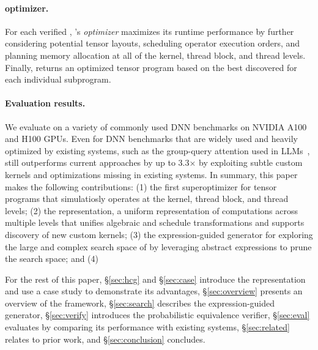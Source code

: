 \paragraph{\graph optimizer.} For each verified \graph, \sys's {\em \graph optimizer} maximizes its runtime performance by further considering potential tensor layouts, scheduling operator execution orders, and planning memory allocation at all of the kernel, thread block, and thread levels.
%
Finally, \sys returns an optimized tensor program based on the best discovered \graph for each individual \lax subprogram.


\paragraph{Evaluation results.}
We evaluate \sys on a variety of commonly used DNN benchmarks on NVIDIA A100 and H100 GPUs.
Even for DNN benchmarks that are widely used and heavily optimized by existing systems, such as the group-query attention used in LLMs~\cite{grattafiori2024llama3herdmodels}, \sys still outperforms current approaches by up to 3.3$\times$ by exploiting subtle custom kernels and optimizations missing in existing systems.
%
%
In summary, this paper makes the following contributions:
(1) the first superoptimizer for tensor programs that simulatiosly operates at the kernel, thread block, and thread levels;
(2) the \graph representation, a uniform representation of computations across multiple levels that unifies algebraic and schedule transformations and supports discovery of new custom kernels;
(3) the expression-guided generator for exploring the large and complex search space of \graphs by leveraging abstract expressions to prune the search space;
and (4) 
\fi 

For the rest of this paper, \S\ref{sec:hcg} and \S\ref{sec:case} introduce the \graph representation and use a case study to demonstrate its advantages, \S\ref{sec:overview} presents an overview of the \sys framework, \S\ref{sec:search} describes the expression-guided generator, \S\ref{sec:verify} introduces the probabilistic equivalence verifier, \S\ref{sec:eval} evaluates \sys by comparing its performance with existing systems, \S\ref{sec:related} relates \sys to prior work, and \S\ref{sec:conclusion} concludes.
\fi